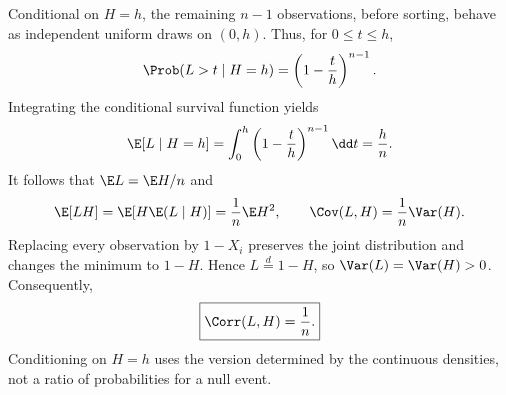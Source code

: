 Conditional on $H=h$, the remaining $n-1$ observations, before sorting, behave as independent uniform draws on $(0,h)$. Thus, for $0\le t\le h$,
\[
\Prob(L>t\mid H=h)=\left(1-\frac th\right)^{n-1}.
\]
Integrating the conditional survival function yields
\[
\E[L\mid H=h]=\int_0^h\left(1-\frac th\right)^{n-1}\dd t
=\frac hn.
\]
It follows that $\E L=\E H/n$ and
\[
\E[LH]=\E\!\left[H\E(L\mid H)\right]=\frac1n\E H^2,
\qquad \Cov(L,H)=\frac1n\Var(H).
\]
Replacing every observation by $1-X_i$ preserves the joint distribution and changes the minimum to $1-H$. Hence $L\overset d=1-H$, so $\Var(L)=\Var(H)>0$. Consequently,
\[
\boxed{\Corr(L,H)=\frac1n.}
\]
Conditioning on $H=h$ uses the version determined by the continuous densities, not a ratio of probabilities for a null event.

